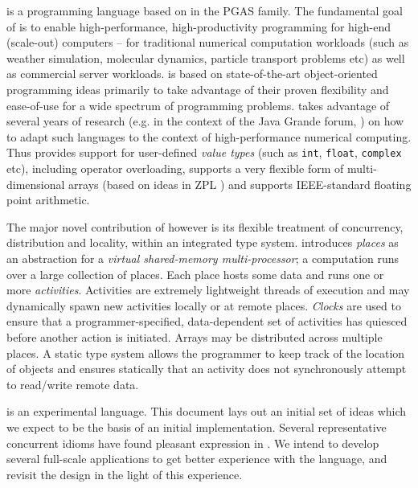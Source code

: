 \Xten{} is a programming language based on \java{} in the PGAS
family. The fundamental goal of \Xten{} is to enable high-performance,
high-productivity programming for high-end (scale-out) computers --
for traditional numerical computation workloads (such as weather
simulation, molecular dynamics, particle transport problems etc) as
well as commercial server workloads. \Xten{} is based on
state-of-the-art object-oriented programming ideas primarily to take
advantage of their proven flexibility and ease-of-use for a wide
spectrum of programming problems. \Xten{} takes advantage of several
years of research (e.g.{} in the context of the Java Grande forum,
\cite{kava}) on how to adapt such languages to the context of
high-performance numerical computing. Thus \Xten{} provides support
for user-defined {\em value types} (such as {\tt int}, {\tt float},
{\tt complex} etc), including operator overloading, supports a very
flexible form of multi-dimensional arrays (based on ideas in ZPL
\cite{zpl}) and supports IEEE-standard floating point arithmetic.

The major novel contribution of \Xten{} however is its flexible
treatment of concurrency, distribution and locality, within an
integrated type system. \Xten{} introduces {\em places} as an
abstraction for a {\em virtual shared-memory multi-processor}; a
computation runs over a large collection of places. Each place hosts
some data and runs one or more {\em activities}. Activities are
extremely lightweight threads of execution and may dynamically spawn
new activities locally or at remote places. {\em Clocks} are used to
ensure that a programmer-specified, data-dependent set of activities
has quiesced before another action is initiated. Arrays may be
distributed across multiple places. A static type system allows the
programmer to keep track of the location of objects and ensures
statically that an activity does not synchronously attempt to
read/write remote data.

\Xten{} is an experimental language. This document lays out an initial set 
of ideas which we expect to be the basis of an initial
implementation. Several representative concurrent idioms have found 
pleasant expression in \Xten. We intend to develop several full-scale
applications to get better experience with the language, and revisit
the design in the light of this experience.



